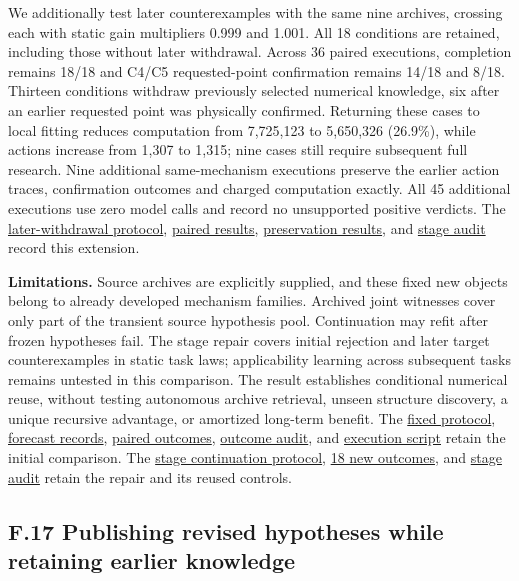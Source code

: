 \documentclass[11pt,a4paper]{article}
\begin{document}
We additionally test later counterexamples with the same nine archives, crossing each with static gain multipliers 0.999 and 1.001. All 18 conditions are retained, including those without later withdrawal. Across 36 paired executions, completion remains 18/18 and C4/C5 requested-point confirmation remains 14/18 and 8/18. Thirteen conditions withdraw previously selected numerical knowledge, six after an earlier requested point was physically confirmed. Returning these cases to local fitting reduces computation from 7,725,123 to 5,650,326 (26.9\%), while actions increase from 1,307 to 1,315; nine cases still require subsequent full research. Nine additional same-mechanism executions preserve the earlier action traces, confirmation outcomes and charged computation exactly. All 45 additional executions use zero model calls and record no unsupported positive verdicts. The \hyperlink{artifact-136}{later-withdrawal protocol}, \hyperlink{artifact-137}{paired results}, \hyperlink{artifact-138}{preservation results}, and \hyperlink{artifact-139}{stage audit} record this extension.


\textbf{Limitations.} Source archives are explicitly supplied, and these fixed new objects belong to already developed mechanism families. Archived joint witnesses cover only part of the transient source hypothesis pool. Continuation may refit after frozen hypotheses fail. The stage repair covers initial rejection and later target counterexamples in static task laws; applicability learning across subsequent tasks remains untested in this comparison. The result establishes conditional numerical reuse, without testing autonomous archive retrieval, unseen structure discovery, a unique recursive advantage, or amortized long-term benefit. The \hyperlink{artifact-140}{fixed protocol}, \hyperlink{artifact-141}{forecast records}, \hyperlink{artifact-142}{paired outcomes}, \hyperlink{artifact-143}{outcome audit}, and \hyperlink{artifact-144}{execution script} retain the initial comparison. The \hyperlink{artifact-145}{stage continuation protocol}, \hyperlink{artifact-146}{18 new outcomes}, and \hyperlink{artifact-147}{stage audit} retain the repair and its reused controls.


\subsection*{F.17 Publishing revised hypotheses while retaining earlier knowledge}
\end{document}
